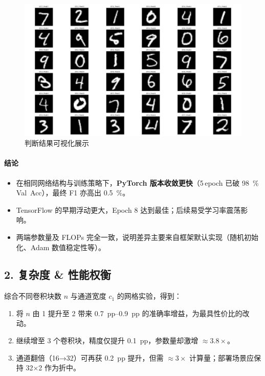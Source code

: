 \documentclass[UTF8]{article}
\begin{document}
\begin{figure}[H]
    \centering
    \includegraphics[width=0.8\linewidth]{result.png}
    \caption{判断结果可视化展示}
    \label{fig:result}
\end{figure}


\paragraph{结论}  
\begin{itemize}
    \item 在相同网络结构与训练策略下，\textbf{PyTorch 版本收敛更快}（5\,epoch 已破 \SI{98}{\percent} Val~Acc），最终 F1 亦高出 \SI{0.5}{\percent}。  
    \item TensorFlow 的早期浮动更大，Epoch 8 达到最佳；后续易受学习率震荡影响。  
    \item 两端参数量及 FLOPs 完全一致，说明差异主要来自框架默认实现（随机初始化、Adam 数值稳定性等）。  
\end{itemize}

\subsection*{2. 复杂度 \& 性能权衡}
综合不同卷积块数 $n$ 与通道宽度 $c_1$ 的网格实验，得到：
\begin{enumerate}
    \item 将 $n$ 由 1 提升至 2 带来 \SI{0.7}{pp}--\SI{0.9}{pp} 的准确率增益，为最具性价比的改动。  
    \item 继续增至 3 个卷积块，精度仅提升 \SI{0.1}{pp}，参数量却激增 \(\approx 3.8\times\)。  
    \item 通道翻倍（16→32）可再获 \SI{0.2}{pp} 提升，但需 \(\approx 3\times\) 计算量；部署场景应保持 32×2 作为折中。  
\end{enumerate}
\end{document}
